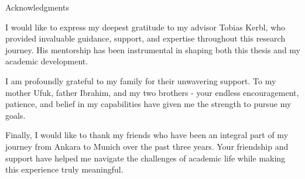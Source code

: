 \thispagestyle{empty}

\vspace*{20mm}

\begin{center}
{ Acknowledgments}
\end{center}

\vspace{10mm}

I would like to express my deepest gratitude to my advisor Tobias Kerbl, who provided invaluable guidance, support, and expertise throughout this research journey. His mentorship has been instrumental in shaping both this thesis and my academic development.

I am profoundly grateful to my family for their unwavering support. To my mother Ufuk, father Ibrahim, and my two brothers - your endless encouragement, patience, and belief in my capabilities have given me the strength to pursue my goals.

Finally, I would like to thank my friends who have been an integral part of my journey from Ankara to Munich over the past three years. Your friendship and support have helped me navigate the challenges of academic life while making this experience truly meaningful.

\cleardoublepage{}
